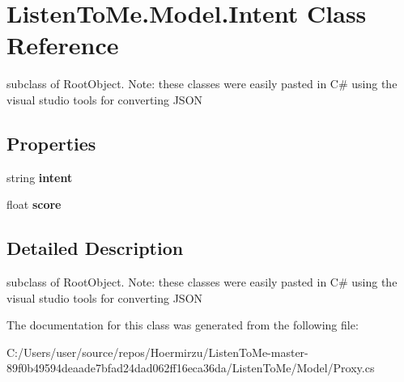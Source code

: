 \hypertarget{class_listen_to_me_1_1_model_1_1_intent}{}\section{Listen\+To\+Me.\+Model.\+Intent Class Reference}
\label{class_listen_to_me_1_1_model_1_1_intent}


subclass of Root\+Object. Note\+: these classes were easily pasted in C\# using the visual studio tools for converting J\+S\+ON  


\subsection*{Properties}
\begin{DoxyCompactItemize}
\item 
string {\bfseries intent}\hypertarget{class_listen_to_me_1_1_model_1_1_intent_a72e3844bbc2658989213e3182068c3d4}{}\label{class_listen_to_me_1_1_model_1_1_intent_a72e3844bbc2658989213e3182068c3d4}

\item 
float {\bfseries score}\hypertarget{class_listen_to_me_1_1_model_1_1_intent_a82e80d6b2c310b22beacb60637a03d20}{}\label{class_listen_to_me_1_1_model_1_1_intent_a82e80d6b2c310b22beacb60637a03d20}

\end{DoxyCompactItemize}


\subsection{Detailed Description}
subclass of Root\+Object. Note\+: these classes were easily pasted in C\# using the visual studio tools for converting J\+S\+ON 



The documentation for this class was generated from the following file\+:\begin{DoxyCompactItemize}
\item 
C\+:/\+Users/user/source/repos/\+Hoermirzu/\+Listen\+To\+Me-\/master-\/89f0b49594deaade7bfad24dad062ff16eca36da/\+Listen\+To\+Me/\+Model/Proxy.\+cs\end{DoxyCompactItemize}
